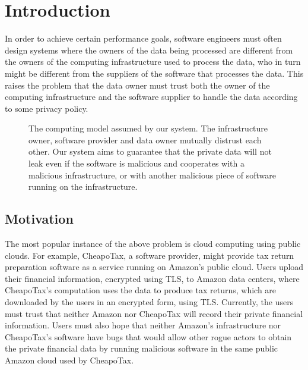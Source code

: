 \section{Introduction}
\label{sec:intro}

In order to achieve certain performance goals, software engineers must often
design systems where the owners of the data being processed are different from
the owners of the computing infrastructure used to process the data, who in
turn might be different from the suppliers of the software that processes the
data. This raises the problem that the data owner must trust both the owner
of the computing infrastructure and the software supplier to handle the data
according to some privacy policy.

\begin{figure}[hbtp]
  \caption{
    The computing model assumed by our system. The infrastructure owner,
    software provider and data owner mutually distrust each other. Our system
    aims to guarantee that the private data will not leak even if the software
    is malicious and cooperates with a malicious infrastructure, or with
    another malicious piece of software running on the infrastructure.
  }
  \label{fig:computing_model}
\end{figure}

\subsection{Motivation}
\label{sec:motivation}

The most popular instance of the above problem is cloud computing using public
clouds. For example, CheapoTax, a software provider, might provide tax return
preparation software as a service running on Amazon's public cloud. Users
upload their financial information, encrypted using TLS, to Amazon data
centers, where CheapoTax's computation uses the data to produce tax returns,
which are downloaded by the users in an encrypted form, using TLS. Currently,
the users must trust that neither Amazon nor CheapoTax will record their
private financial information. Users must also hope that neither Amazon's
infrastructure nor CheapoTax's software have bugs that would allow other rogue
actors to obtain the private financial data by running malicious software in
the same public Amazon cloud used by CheapoTax.

